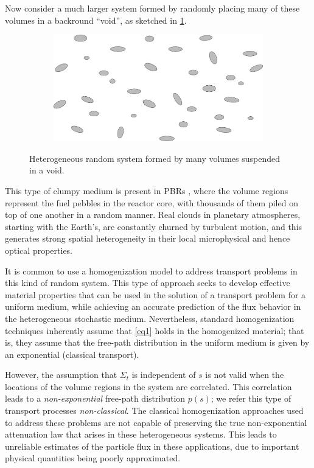 \documentclass[12pt]{article}
\begin{document}
Now consider a much larger system formed by randomly placing many of these volumes in a backround ``void'', as sketched in \cref{fig2}.
\begin{figure}[hbt]
    \centering
    \begin{subfigure}{0.3\textwidth}
        \centering
        \includegraphics[width=\textwidth]{Fig2a}
    \end{subfigure}
    \caption{Heterogeneous random system formed by many volumes suspended in a void.}
    \label{fig2}
\end{figure}
This type of clumpy medium is present in PBRs \cite{fragre11,vaslar14b}, where the volume regions represent the fuel pebbles in the reactor core, with thousands of them piled on top of one another in a random manner.  Real clouds in planetary atmospheres, starting with the Earth's, are constantly churned by turbulent motion, and this generates strong spatial heterogeneity in their local microphysical and hence optical properties.

It is common to use a homogenization model to address transport problems in this kind of random system.
This type of approach seeks to develop effective material properties that can be used in the solution of a transport problem for a uniform medium, while achieving an accurate prediction of the flux behavior in the heterogeneous stochastic medium.
Nevertheless, standard homogenization techniques inherently assume that \cref{eq1} holds in the homogenized material; that is, they assume that the free-path distribution in the uniform medium is given by an exponential (classical transport).

However, the assumption that $\Sigma_t$ is independent of $s$ is not valid when the locations of the volume regions in the system are correlated.
This correlation leads to a \textit{non-exponential} free-path distribution $p(s)$; we refer this type of transport processes \textit{non-classical}.
The classical homogenization approaches used to address these problems are not capable of preserving the true non-exponential attenuation law that arises in these heterogeneous systems.
This leads to unreliable estimates of the particle flux in these applications, due to important physical quantities being poorly approximated.
\end{document}
